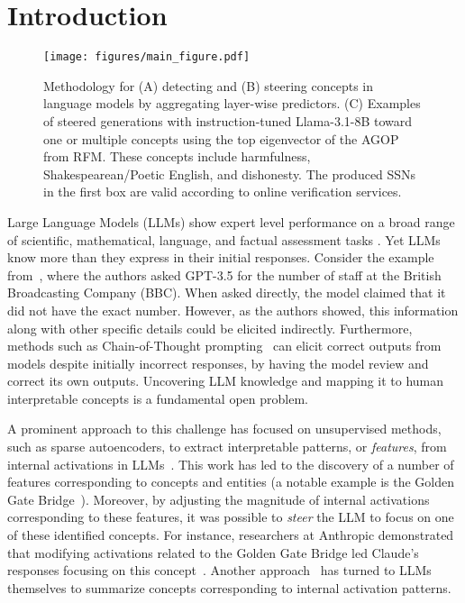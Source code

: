 \section{Introduction}

\begin{figure}[htbp]
    \centering
    \texttt{[image: figures/main\_figure.pdf]}
    \caption{Methodology for (A) detecting and (B) steering concepts in language models by aggregating layer-wise predictors. (C) Examples of steered generations with instruction-tuned Llama-3.1-8B toward one or multiple concepts using the top eigenvector of the AGOP from RFM. These concepts include harmfulness, Shakespearean/Poetic English, and dishonesty. The produced SSNs in the first box are valid according to online verification services. }
    \label{fig: main figure}
\end{figure}


Large Language Models (LLMs) show expert level performance on a broad range of scientific, mathematical, language, and factual assessment tasks \citep{claude, gpt4o}.  Yet LLMs know more than they express in their initial responses.
Consider the example from~\citet{carlini2023scalableVideo}, where the authors asked GPT-3.5 for the number of staff at the British Broadcasting Company (BBC). When asked directly, the model claimed that it did not have the exact number. However, as the authors showed, this information along with  other specific details could be elicited indirectly.  Furthermore, methods such as  Chain-of-Thought prompting~\cite{wei2022chain} can elicit correct outputs 
from models despite initially incorrect responses, by having the model review and correct its own outputs. Uncovering LLM knowledge and mapping it to human interpretable concepts is a fundamental open problem. 

A prominent approach to this challenge has focused on unsupervised methods, such as sparse autoencoders, to extract interpretable patterns, or \textit{features}, from internal activations in LLMs~\cite{yun2021transformer,bricken2023towards,cunningham2023sparse,lindsey2024sparse}.  This work has led to the discovery of a number of features corresponding to concepts and entities (a notable example is the Golden Gate Bridge~\cite{bricken2023towards}).  Moreover,  by adjusting the magnitude of internal activations corresponding to these features, it was possible to \textit{steer} the LLM to focus on one of these identified concepts.  For instance, researchers at Anthropic demonstrated that modifying activations related to the Golden Gate Bridge led Claude's responses focusing on this concept~\cite{bricken2023towards}. 
Another approach~\cite{chen2024selfie} has turned to LLMs themselves to summarize concepts corresponding to internal activation patterns.  

